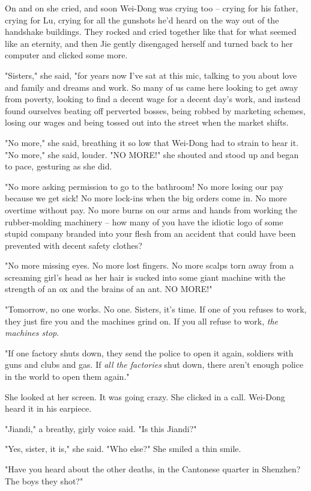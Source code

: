 On and on she cried, and soon Wei-Dong was crying too -- crying for
his father, crying for Lu, crying for all the gunshots he'd heard
on the way out of the handshake buildings. They rocked and cried
together like that for what seemed like an eternity, and then Jie
gently disengaged herself and turned back to her computer and
clicked some more.

"Sisters," she said, "for years now I've sat at this mic, talking
to you about love and family and dreams and work. So many of us
came here looking to get away from poverty, looking to find a
decent wage for a decent day's work, and instead found ourselves
beating off perverted bosses, being robbed by marketing schemes,
losing our wages and being tossed out into the street when the
market shifts.

"No more," she said, breathing it so low that Wei-Dong had to
strain to hear it. "No more," she said, louder. "NO MORE!" she
shouted and stood up and began to pace, gesturing as she did.

"No more asking permission to go to the bathroom! No more losing
our pay because we get sick! No more lock-ins when the big orders
come in. No more overtime without pay. No more burns on our arms
and hands from working the rubber-molding machinery -- how many of
you have the idiotic logo of some stupid company branded into your
flesh from an accident that could have been prevented with decent
safety clothes?

"No more missing eyes. No more lost fingers. No more scalps torn
away from a screaming girl's head as her hair is sucked into some
giant machine with the strength of an ox and the brains of an ant.
NO MORE!"

"Tomorrow, no one works. No one. Sisters, it's time. If one of you
refuses to work, they just fire you and the machines grind on. If
you all refuse to work, \emph{the machines stop}.

"If one factory shuts down, they send the police to open it again,
soldiers with guns and clubs and gas. If \emph{all the factories}
shut down, there aren't enough police in the world to open them
again."

She looked at her screen. It was going crazy. She clicked in a
call. Wei-Dong heard it in his earpiece.

"Jiandi," a breathy, girly voice said. "Is this Jiandi?"

"Yes, sister, it is," she said. "Who else?" She smiled a thin
smile.

"Have you heard about the other deaths, in the Cantonese quarter in
Shenzhen? The boys they shot?"

